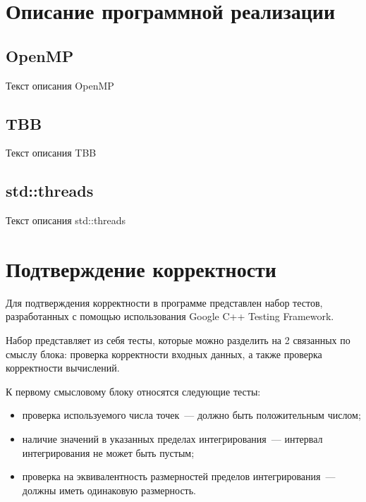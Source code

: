 \documentclass{report}
\begin{document}
\section*{Описание программной реализации}

\subsection*{OpenMP}
Текст описания OpenMP

\subsection*{TBB}
Текст описания TBB

\subsection*{std::threads}
Текст описания std::threads

\newpage

\section*{Подтверждение корректности}
\indent\par Для подтверждения корректности в программе представлен набор тестов, разработанных с помощью использования Google C++ Testing Framework.
\par Набор представляет из себя тесты, которые можно разделить на 2 связанных по смыслу блока: проверка корректности входных данных, а также проверка корректности вычислений.

\par К первому смысловому блоку относятся следующие тесты: 
\begin{itemize}
\item проверка используемого числа точек~--- должно быть положительным числом;
\item наличие значений в указанных пределах интегрирования~--- интервал интегрирования не может быть пустым;
\item проверка на эквивалентность размерностей пределов интегрирования~--- должны иметь одинаковую размерность.
\end{itemize}
 
\end{document}
